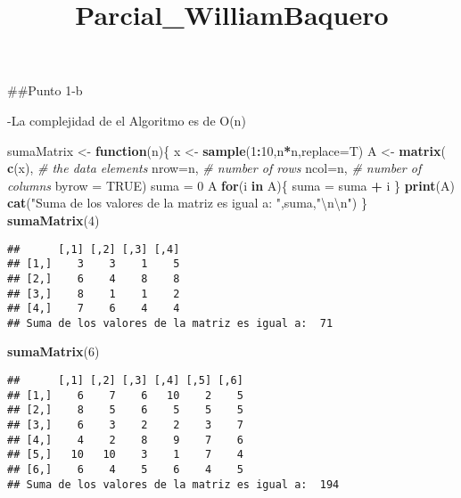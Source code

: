 \documentclass[]{article}
\title{Parcial\_WilliamBaquero}
\author{}
\date{}
\newenvironment{Shaded}{\begin{snugshade}}{\end{snugshade}}
\newcommand{\CharTok}[1]{\textcolor[rgb]{0.31,0.60,0.02}{#1}}
\newcommand{\CommentTok}[1]{\textcolor[rgb]{0.56,0.35,0.01}{\textit{#1}}}
\newcommand{\ControlFlowTok}[1]{\textcolor[rgb]{0.13,0.29,0.53}{\textbf{#1}}}
\newcommand{\DataTypeTok}[1]{\textcolor[rgb]{0.13,0.29,0.53}{#1}}
\newcommand{\DecValTok}[1]{\textcolor[rgb]{0.00,0.00,0.81}{#1}}
\newcommand{\KeywordTok}[1]{\textcolor[rgb]{0.13,0.29,0.53}{\textbf{#1}}}
\newcommand{\NormalTok}[1]{#1}
\newcommand{\OperatorTok}[1]{\textcolor[rgb]{0.81,0.36,0.00}{\textbf{#1}}}
\newcommand{\OtherTok}[1]{\textcolor[rgb]{0.56,0.35,0.01}{#1}}
\newcommand{\StringTok}[1]{\textcolor[rgb]{0.31,0.60,0.02}{#1}}
\begin{document}
\maketitle

\#\#Punto 1-b

-La complejidad de el Algoritmo es de O(n)

\begin{Shaded}
\begin{Highlighting}[]
\NormalTok{sumaMatrix <-}\StringTok{ }\ControlFlowTok{function}\NormalTok{(n)\{}
\NormalTok{  x <-}\StringTok{ }\KeywordTok{sample}\NormalTok{(}\DecValTok{1}\OperatorTok{:}\DecValTok{10}\NormalTok{,n}\OperatorTok{*}\NormalTok{n,}\DataTypeTok{replace=}\NormalTok{T)}
\NormalTok{  A <-}\StringTok{ }\KeywordTok{matrix}\NormalTok{( }
    \KeywordTok{c}\NormalTok{(x), }\CommentTok{# the data elements }
    \DataTypeTok{nrow=}\NormalTok{n,              }\CommentTok{# number of rows }
    \DataTypeTok{ncol=}\NormalTok{n,              }\CommentTok{# number of columns }
    \DataTypeTok{byrow =} \OtherTok{TRUE}\NormalTok{)}
\NormalTok{  suma =}\StringTok{ }\DecValTok{0}
\NormalTok{  A}
  \ControlFlowTok{for}\NormalTok{(i }\ControlFlowTok{in}\NormalTok{ A)\{}
\NormalTok{    suma =}\StringTok{ }\NormalTok{suma }\OperatorTok{+}\StringTok{ }\NormalTok{i}
\NormalTok{  \}}
  \KeywordTok{print}\NormalTok{(A)}
  \KeywordTok{cat}\NormalTok{(}\StringTok{"Suma de los valores de la matriz es igual a: "}\NormalTok{,suma,}\StringTok{"}\CharTok{\textbackslash{}n\textbackslash{}n}\StringTok{"}\NormalTok{)}
\NormalTok{\}}
\KeywordTok{sumaMatrix}\NormalTok{(}\DecValTok{4}\NormalTok{)}
\end{Highlighting}
\end{Shaded}

\begin{verbatim}
##      [,1] [,2] [,3] [,4]
## [1,]    3    3    1    5
## [2,]    6    4    8    8
## [3,]    8    1    1    2
## [4,]    7    6    4    4
## Suma de los valores de la matriz es igual a:  71
\end{verbatim}

\begin{Shaded}
\begin{Highlighting}[]
\KeywordTok{sumaMatrix}\NormalTok{(}\DecValTok{6}\NormalTok{)}
\end{Highlighting}
\end{Shaded}

\begin{verbatim}
##      [,1] [,2] [,3] [,4] [,5] [,6]
## [1,]    6    7    6   10    2    5
## [2,]    8    5    6    5    5    5
## [3,]    6    3    2    2    3    7
## [4,]    4    2    8    9    7    6
## [5,]   10   10    3    1    7    4
## [6,]    6    4    5    6    4    5
## Suma de los valores de la matriz es igual a:  194
\end{verbatim}
\end{document}
